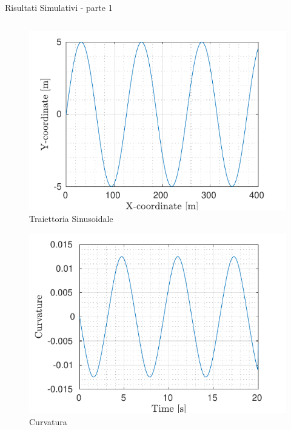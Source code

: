 \documentclass{beamer}
\begin{document}
	\begin{frame}{Risultati Simulativi - parte 1}
		\vspace{-1.4em}
		\begin{columns}[onlytextwidth,T]	
			\begin{column}[c]{0.5\columnwidth}
				\begin{figure}[!h]
					\includegraphics[width=0.92\columnwidth]{../../MATLAB/lane_following/figure/Reference.pdf}
					\vspace{-0.5em}
					\caption{Traiettoria Sinusoidale}	
				\end{figure}
				\begin{figure}[!h]
					\vspace{-2.4em}
					\includegraphics[width=0.92\columnwidth]{../../MATLAB/lane_following/figure/Curvature.pdf}
					\vspace{-0.5em}
					\caption{Curvatura}
				\end{figure}
			\end{column}

\end{columns}
\end{frame}
\end{document}
